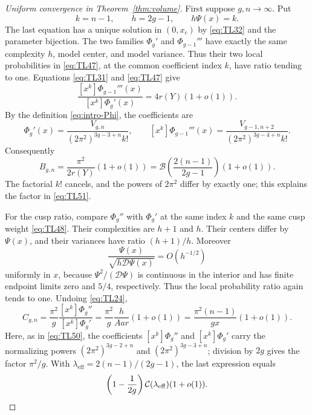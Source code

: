 \begin{proof}[Uniform convergence in Theorem~\ref{thm:volume}]
First suppose \(g,n\to\infty\). Put \begin{equation}
k=n-1,\qquad h=2g-1,
 \qquad h\Psi(x)=k.
 \label{eq:TL48}
\end{equation} The last equation has a unique solution in \((0,x_c)\) by \eqref{eq:TL32} and
the parameter bijection. The two families \(\Phi_g'\) and
\(\Phi_{g-1}'''\) have exactly the same complexity \(h\), model center,
and model variance. Thus their two local probabilities in \eqref{eq:TL47}, at the
common coefficient index \(k\), have ratio tending to one. Equations
\eqref{eq:TL31} and \eqref{eq:TL47} give \begin{equation}
\frac{[x^k]\Phi_{g-1}'''(x)}{[x^k]\Phi_g'(x)}
 =4r(Y)(1+o(1)).
 \label{eq:TL49}
\end{equation} By the definition \eqref{eq:intro-Phi}, the coefficients are \begin{equation}
[x^k]\Phi_g'(x)=
 \frac{V_{g,n}}{(2\pi^2)^{3g-3+n}k!},\qquad
 [x^k]\Phi_{g-1}'''(x)=
 \frac{V_{g-1,n+2}}{(2\pi^2)^{3g-4+n}k!}.
 \label{eq:TL50}
\end{equation} Consequently \begin{equation}
B_{g,n}=\frac{\pi^2}{2r(Y)}(1+o(1))
 =\mathcal B\left(\frac{2(n-1)}{2g-1}\right)(1+o(1)).
 \label{eq:TL51}
\end{equation} The factorial \(k!\) cancels, and the powers of \(2\pi^2\) differ by
exactly one; this explains the factor in \eqref{eq:TL51}.

For the cusp ratio, compare \(\Phi_g''\) with \(\Phi_g'\) at the same
index \(k\) and the same cusp weight \eqref{eq:TL48}. Their complexities are \(h+1\)
and \(h\). Their centers differ by \(\Psi(x)\), and their variances have
ratio \((h+1)/h\). Moreover \begin{equation}
\frac{\Psi(x)}{\sqrt{h\mathscr D\Psi(x)}}=O(h^{-1/2})
 \label{eq:TL52}
\end{equation} uniformly in \(x\), because \(\Psi^2/(\mathscr D\Psi)\) is continuous
in the interior and has finite endpoint limits zero and \(5/4\),
respectively. Thus the local probability ratio again tends to one.
Undoing \eqref{eq:TL24}, \begin{equation}
C_{g,n}=\frac{\pi^2}{g}
 \frac{[x^k]\Phi_g''}{[x^k]\Phi_g'}
 =\frac{\pi^2}{g}\frac{h}{Aar}(1+o(1))
 =\frac{\pi^2(n-1)}{gx}(1+o(1)).
 \label{eq:TL53}
\end{equation} Here, as in \eqref{eq:TL50}, the coefficients \([x^k]\Phi_g''\) and
\([x^k]\Phi_g'\) carry the normalizing powers \((2\pi^2)^{3g-2+n}\) and
\((2\pi^2)^{3g-3+n}\); division by \(2g\) gives the factor \(\pi^2/g\). With
\(\lambda_{\mathrm{eff}}=2(n-1)/(2g-1)\), the last expression equals \begin{equation}
\left(1-\frac1{2g}\right)\mathcal C(\lambda_{\rm eff})(1+o(1)).
 \label{eq:TL54}
\end{equation}


\end{proof}

